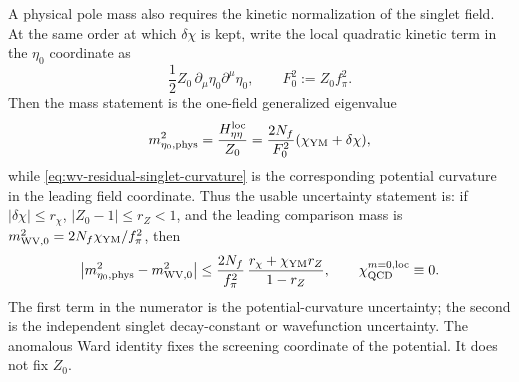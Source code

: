 \begin{controlledapproximation}
A physical pole mass also requires the kinetic normalization of the singlet
field.  At the same order at which \(\delta\chi\) is kept, write the local
quadratic kinetic term in the \(\eta_0\) coordinate as
\begin{equation}
  \frac12 Z_0\,\partial_\mu\eta_0\partial^\mu\eta_0,
  \qquad
  F_0^2:=Z_0f_\pi^2 .
  \label{eq:wv-singlet-kinetic-residual}
\end{equation}
Then the mass statement is the one-field generalized eigenvalue
\begin{equation}
  m_{\eta_0,{\rm phys}}^2
  =
  \frac{H_{\eta\eta}^{\rm loc}}{Z_0}
  =
  \frac{2N_f}{F_0^2}(\chi_{\rm YM}+\delta\chi),
  \label{eq:wv-residual-physical-singlet-mass}
\end{equation}
while \eqref{eq:wv-residual-singlet-curvature} is the corresponding potential
curvature in the leading field coordinate.  Thus the usable uncertainty
statement is: if \(|\delta\chi|\le r_\chi\), \(|Z_0-1|\le r_Z<1\), and the
leading comparison mass is \(m_{\rm WV,0}^2=2N_f\chi_{\rm YM}/f_\pi^2\), then
\begin{equation}
  \left|
    m_{\eta_0,{\rm phys}}^2-m_{\rm WV,0}^2
  \right|
  \le
  \frac{2N_f}{f_\pi^2}\,
  \frac{r_\chi+\chi_{\rm YM}r_Z}{1-r_Z},
  \qquad
  \chi_{\rm QCD}^{m=0,{\rm loc}}\equiv0 .
  \label{eq:wv-residual-mass-bound}
\end{equation}
The first term in the numerator is the potential-curvature uncertainty; the
second is the independent singlet decay-constant or wavefunction uncertainty.
The anomalous Ward identity fixes the screening coordinate of the potential.  It
does not fix \(Z_0\).


\end{controlledapproximation}
